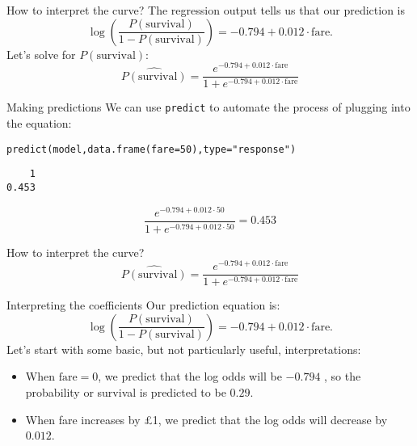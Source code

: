 \documentclass{beamer}\usepackage[]{graphicx}\usepackage[]{color}
\makeatletter
\newcommand{\hlnum}[1]{\textcolor[rgb]{0.824,0.412,0.118}{#1}}%
\newcommand{\hlstr}[1]{\textcolor[rgb]{1,0.894,0.71}{#1}}%
\newcommand{\hlstd}[1]{\textcolor[rgb]{1,0.894,0.769}{#1}}%
\newcommand{\hlkwc}[1]{\textcolor[rgb]{0.78,0.941,0.545}{#1}}%
\newcommand{\hlkwd}[1]{\textcolor[rgb]{1,0.78,0.769}{#1}}%
\newenvironment{kframe}{%
 \def\at@end@of@kframe{}%
 \ifinner\ifhmode%
  \def\at@end@of@kframe{\end{minipage}}%
  \begin{minipage}{\columnwidth}%
 \fi\fi%
 \def\FrameCommand##1{\hskip\@totalleftmargin \hskip-\fboxsep
 \colorbox{shadecolor}{##1}\hskip-\fboxsep
     \hskip-\linewidth \hskip-\@totalleftmargin \hskip\columnwidth}%
 \MakeFramed {\advance\hsize-\width
   \@totalleftmargin\z@ \linewidth\hsize
   \@setminipage}}%
 {\par\unskip\endMakeFramed%
 \at@end@of@kframe}
\newenvironment{knitrout}{}{} %
\makeatother
\begin{document}
\begin{darkframes}
\begin{frame}{How to interpret the curve?}
      The regression output tells us that our prediction is
      \[
        \log\left(\frac{P(\text{survival})}{1-P(\text{survival})}\right) = -0.794 + 0.012\cdot\text{fare}.
      \]
      \pause
      Let's solve for $P(\text{survival})$:
      \[
        \widehat{P(\text{survival})} = \frac{e^{-0.794 + 0.012\cdot\text{fare}}}{1 + e^{-0.794 + 0.012\cdot\text{fare}}}
      \]
      \lc
    \end{frame}

    \begin{frame}[fragile]{Making predictions}
      We can use \texttt{predict} to automate the process of plugging into the equation:
\begin{knitrout}
\begin{kframe}
\begin{alltt}
\hlkwd{predict}\hlstd{(model,} \hlkwd{data.frame}\hlstd{(}\hlkwc{fare}\hlstd{=}\hlnum{50}\hlstd{),} \hlkwc{type}\hlstd{=}\hlstr{"response"}\hlstd{)}
\end{alltt}
\begin{verbatim}
    1 
0.453 
\end{verbatim}
\end{kframe}
\end{knitrout}
      
      \[
        \frac{e^{-0.794 + 0.012\cdot 50}}{1 + e^{-0.794 + 0.012\cdot 50}} = 0.453
      \]
    \end{frame}

    \begin{frame}[fragile]{How to interpret the curve?}
      \[
        \widehat{P(\text{survival})} = \frac{e^{-0.794 + 0.012\cdot\text{fare}}}{1 + e^{-0.794 + 0.012\cdot\text{fare}}}
      \]
\begin{knitrout}


\end{knitrout}
    \end{frame}

    \begin{frame}{Interpreting the coefficients}
      Our prediction equation is:
      \[
        \log\left(\frac{P(\text{survival})}{1-P(\text{survival})}\right) = -0.794 + 0.012\cdot\text{fare}.
      \]
      Let's start with some basic, but not particularly useful, interpretations:
      \begin{itemize}[<+->]
        \item When $\text{fare}=0$, we predict that the log odds will be $-0.794$ \pause, so the probability or survival is predicted to be $0.29$.
        \item When fare increases by \pounds 1, we predict that the log odds will decrease by $0.012$.
      \end{itemize}
    \end{frame}


\end{darkframes}
\end{document}
